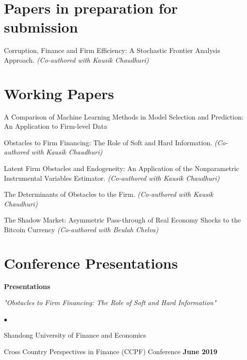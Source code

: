 \documentclass[margin,line,9pt]{res}
\newenvironment{list1}{
  \begin{list}{\ding{113}}{%
      \setlength{\itemsep}{0in}
      \setlength{\parsep}{0in} \setlength{\parskip}{0in}
      \setlength{\topsep}{0in} \setlength{\partopsep}{0in}
      \setlength{\leftmargin}{0.17in}}}{\end{list}}
\newenvironment{list2}{
  \begin{list}{$\bullet$}{%
      \setlength{\itemsep}{0in}
      \setlength{\parsep}{0in} \setlength{\parskip}{0in}
      \setlength{\topsep}{0in} \setlength{\partopsep}{0in}
      \setlength{\leftmargin}{0.2in}}}{\end{list}}
\begin{document}
\begin{resume}
\section{\sc Papers in preparation for submission}

Corruption, Finance and Firm Efficiency: A Stochastic Frontier Analysis Approach. \textit{(Co-authored with Kausik Chaudhuri)}

\section{\sc Working Papers}

A Comparison of Machine Learning Methods in Model Selection and Prediction: An Application to Firm-level Data

Obstacles to Firm Financing: The Role of Soft and Hard Information. \textit{(Co-authored with Kausik Chaudhuri)}

Latent Firm Obstacles and Endogeneity: An Application of the Nonparametric Instrumental Variables Estimator. \textit{(Co-authored with Kausik Chaudhuri)}

The Determinants of Obstacles to the Firm. \textit{(Co-authored with Kausik Chaudhuri)}

The Shadow Market: Asymmetric Pass-through of Real Economy Shocks to the Bitcoin Currency \textit{(Co-authored with Beulah Chelva)}

\section{\sc Conference Presentations}

\textbf{Presentations}\\
\begin{list1}
\item[] \textit{"Obstacles to Firm Financing: The Role of Soft and Hard Information"}
\vspace*{.1in}
\begin{list2}
\item Shandong University of Finance and Economics 
\item[] Cross Country Perspectives in Finance (CCPF) Conference \hfill \textbf{June 2019}
\end{list2}
\end{list1}


\end{resume}
\end{document}
